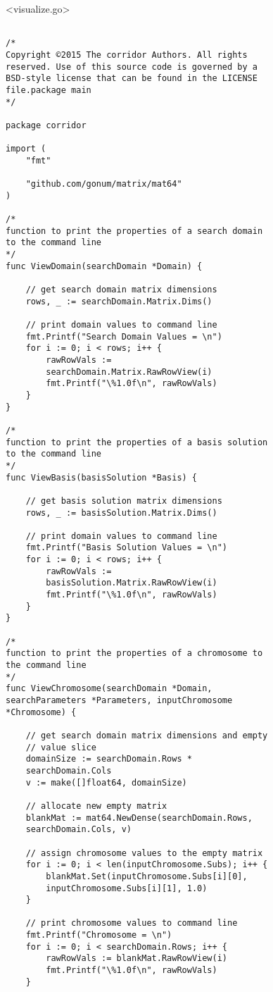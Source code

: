 \newpage

<visualize.go>

\begin{lstlisting}[basicstyle=\small]

/* 
Copyright ©2015 The corridor Authors. All rights 
reserved. Use of this source code is governed by a 
BSD-style license that can be found in the LICENSE 
file.package main
*/

package corridor

import (
	"fmt"

	"github.com/gonum/matrix/mat64"
)

/* 
function to print the properties of a search domain 
to the command line
*/
func ViewDomain(searchDomain *Domain) {

	// get search domain matrix dimensions
	rows, _ := searchDomain.Matrix.Dims()

	// print domain values to command line
	fmt.Printf("Search Domain Values = \n")
	for i := 0; i < rows; i++ {
		rawRowVals := 
		searchDomain.Matrix.RawRowView(i)
		fmt.Printf("\%1.0f\n", rawRowVals)
	}
}

/* 
function to print the properties of a basis solution 
to the command line
*/
func ViewBasis(basisSolution *Basis) {

	// get basis solution matrix dimensions
	rows, _ := basisSolution.Matrix.Dims()

	// print domain values to command line
	fmt.Printf("Basis Solution Values = \n")
	for i := 0; i < rows; i++ {
		rawRowVals := 
		basisSolution.Matrix.RawRowView(i)
		fmt.Printf("\%1.0f\n", rawRowVals)
	}
}

/*
function to print the properties of a chromosome to 
the command line
*/
func ViewChromosome(searchDomain *Domain, 
searchParameters *Parameters, inputChromosome 
*Chromosome) {

	// get search domain matrix dimensions and empty 
	// value slice
	domainSize := searchDomain.Rows * 
	searchDomain.Cols
	v := make([]float64, domainSize)

	// allocate new empty matrix
	blankMat := mat64.NewDense(searchDomain.Rows, 
	searchDomain.Cols, v)

	// assign chromosome values to the empty matrix
	for i := 0; i < len(inputChromosome.Subs); i++ {
		blankMat.Set(inputChromosome.Subs[i][0], 
		inputChromosome.Subs[i][1], 1.0)
	}

	// print chromosome values to command line
	fmt.Printf("Chromosome = \n")
	for i := 0; i < searchDomain.Rows; i++ {
		rawRowVals := blankMat.RawRowView(i)
		fmt.Printf("\%1.0f\n", rawRowVals)
	}


\end{lstlisting}
